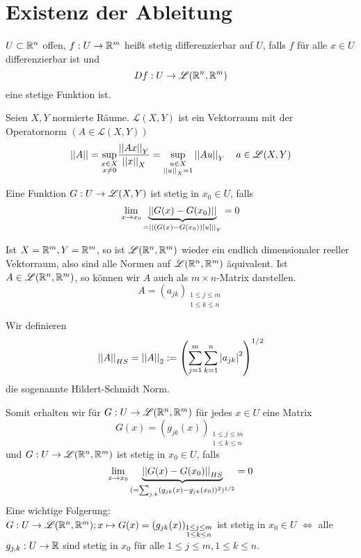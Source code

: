 \documentclass[../ana2.tex]{subfiles}
\begin{document}
\setcounter{section}{11}
\section{Existenz der Ableitung}
\begin{defi*}
    \(U \subset \mathbb{R}^n \) offen, \(f:U\rightarrow \mathbb{R}^m\) heißt
    stetig differenzierbar auf \(U\), falls \(f\) für alle
    \(x \in U\) differenzierbar ist und    
    \[ Df:U\rightarrow \mathscr{L}(\mathbb{R}^n, \mathbb{R}^m) \]
    eine stetige Funktion ist.
\end{defi*}
\begin{bem}
    Seien \(X, Y\) normierte Räume. 
    \( \mathscr{L}(X,Y) \) ist ein Vektorraum mit
    der Operatornorm \( (A \in \mathscr{L}(X,Y)) \)
    \[ \left|\left|A\right|\right| = \underset{\substack{x\in X\\x\neq 0}}{\sup}
    \frac{\left|\left|Ax\right|\right|_Y}{\left|\left|x\right|\right|_X} 
    = \underset{\substack{u\in X\\ \left|\left|u\right|\right|_X = 1}}{\sup}
    \left|\left|Au\right|\right|_Y
    \quad a \in \mathscr{L}(X,Y) \]
\end{bem}
\begin{bem}
    Eine Funktion \(G:U\rightarrow \mathscr{L}(X,Y)\) ist 
    stetig in \(x_0 \in U\), falls 
    \[ \lim\limits_{x\rightarrow{}x_0} \underbrace{\left|\left|G(x) - G(x_0)\right|\right|}_{
        = \left|\left|(G(x) - G(x_0))[u]\right|\right|_Y
    } = 0 \]
\end{bem}
Ist \(X=\mathbb{R}^m, Y = \mathbb{R}^m\), so ist \(\mathscr{L}(\mathbb{R}^n, \mathbb{R}^m)\)
wieder ein endlich dimensionaler reeller Vektorraum, also sind 
alle Normen auf \( \mathscr{L}(\mathbb{R}^n, \mathbb{R}^m) \) äquivalent.
Ist \( A \in \mathscr{L}(\mathbb{R}^n, \mathbb{R}^m) \), so können wir \(A\) 
auch als \( m \times n \)-Matrix darstellen.
\[ A = (a_{jk})_{\substack{ 1 \leq j \leq m\\1 \leq k \leq n }} \]
\begin{defi*}
    Wir definieren
    \[ \left|\left|A\right|\right|_{HS} = \left|\left|A\right|\right|_2 := \left( 
        \sum_{j=1}^m \sum_{k=1}^n \left|a_{jk}\right|^2 \right)^{1/2} \]
    die sogenannte Hildert-Schmidt Norm.
\end{defi*}
Somit erhalten wir für \( G:U\rightarrow \mathscr{L}(\mathbb{R}^n, \mathbb{R}^m) \) 
für jedes \( x \in U \) eine Matrix
\[ G(x) = (g_{jk}(x))_{\substack{1 \leq j \leq m \\ 
1 \leq k \leq n}} \]
und \( G:U\rightarrow \mathscr{L}(\mathbb{R}^n, \mathbb{R}^m) \) ist stetig 
in \(x_0 \in U\), falls
\[ \lim\limits_{x\rightarrow{}x_0} \underbrace{\left|\left|G(x) - G(x_0)\right|\right|_{HS}}_{
    (= \sum_{j,k} (g_{jk}(x)-g_{jk}(x_0))^2)^{1/2}} = 0 \]
Eine wichtige Folgerung:\\
\( G:U\rightarrow \mathscr{L}(\mathbb{R}^n, \mathbb{R}^m); x \mapsto G(x) 
= (g_{jk}(x))_{\substack{1 \leq j \leq m 
\\ 1 \leq k \leq n}} \)
ist stetig in \( x_0 \in U \)
\( \Leftrightarrow \) alle \( g_{j,k}:U\rightarrow \mathbb{R} \) 
sind stetig in \(x_0\) für alle 
\( 1 \leq j \leq m, 1 \leq k \leq n \).\\
\end{document}
